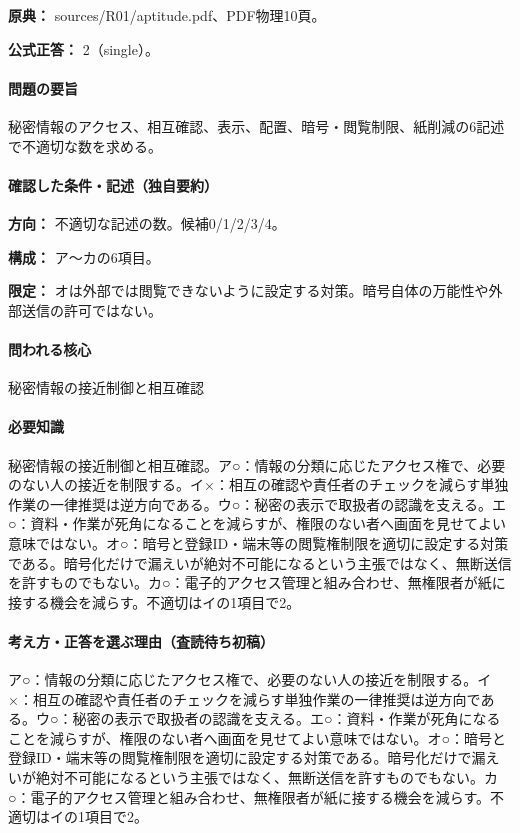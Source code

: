 \noindent\textbf{原典：} sources/R01/aptitude.pdf、PDF物理10頁。

\textbf{公式正答：} 2（single）。

\paragraph{問題の要旨} 秘密情報のアクセス、相互確認、表示、配置、暗号・閲覧制限、紙削減の6記述で不適切な数を求める。

\paragraph{確認した条件・記述（独自要約）}\mbox{}\par

\noindent\textbf{方向：} 不適切な記述の数。候補0/1/2/3/4。\par

\noindent\textbf{構成：} ア〜カの6項目。\par

\noindent\textbf{限定：} オは外部では閲覧できないように設定する対策。暗号自体の万能性や外部送信の許可ではない。\par

\paragraph{問われる核心} 秘密情報の接近制御と相互確認

\paragraph{必要知識} 秘密情報の接近制御と相互確認。ア○：情報の分類に応じたアクセス権で、必要のない人の接近を制限する。イ×：相互の確認や責任者のチェックを減らす単独作業の一律推奨は逆方向である。ウ○：秘密の表示で取扱者の認識を支える。エ○：資料・作業が死角になることを減らすが、権限のない者へ画面を見せてよい意味ではない。オ○：暗号と登録ID・端末等の閲覧権制限を適切に設定する対策である。暗号化だけで漏えいが絶対不可能になるという主張ではなく、無断送信を許すものでもない。カ○：電子的アクセス管理と組み合わせ、無権限者が紙に接する機会を減らす。不適切はイの1項目で2。

\paragraph{考え方・正答を選ぶ理由（査読待ち初稿）} ア○：情報の分類に応じたアクセス権で、必要のない人の接近を制限する。イ×：相互の確認や責任者のチェックを減らす単独作業の一律推奨は逆方向である。ウ○：秘密の表示で取扱者の認識を支える。エ○：資料・作業が死角になることを減らすが、権限のない者へ画面を見せてよい意味ではない。オ○：暗号と登録ID・端末等の閲覧権制限を適切に設定する対策である。暗号化だけで漏えいが絶対不可能になるという主張ではなく、無断送信を許すものでもない。カ○：電子的アクセス管理と組み合わせ、無権限者が紙に接する機会を減らす。不適切はイの1項目で2。

